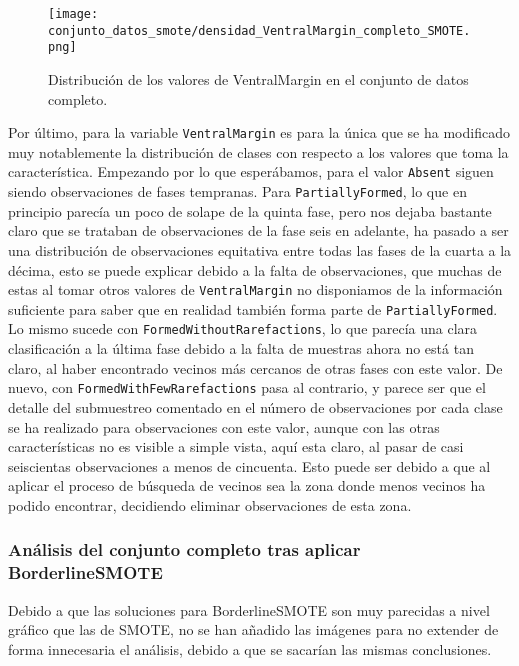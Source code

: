 \begin{figure}[H]
	\centering
	\texttt{[image: conjunto\_datos\_smote/densidad\_VentralMargin\_completo\_SMOTE.png]}
	\caption{Distribución de los valores de VentralMargin en el conjunto de datos completo.}
	\label{fig:densidad_VentralMargin_completo_smote}
\end{figure}

Por último, para la variable \texttt{VentralMargin} es para la única que se ha modificado muy notablemente la distribución de clases con respecto a los valores que toma la característica. Empezando por lo que esperábamos, para el valor \texttt{Absent} siguen siendo observaciones de fases tempranas. Para \texttt{PartiallyFormed}, lo que en principio parecía un poco de solape de la quinta fase, pero nos dejaba bastante claro que se trataban de observaciones de la fase seis en adelante, ha pasado a ser una distribución de observaciones equitativa entre todas las fases de la cuarta a la décima, esto se puede explicar debido a la falta de observaciones, que muchas de estas al tomar otros valores de \texttt{VentralMargin} no disponiamos de la información suficiente para saber que en realidad también forma parte de \texttt{PartiallyFormed}. Lo mismo sucede con \texttt{FormedWithoutRarefactions}, lo que parecía una clara clasificación a la última fase debido a la falta de muestras ahora no está tan claro, al haber encontrado vecinos más cercanos de otras fases con este valor. De nuevo, con \texttt{FormedWithFewRarefactions} pasa al contrario, y parece ser que el detalle del submuestreo comentado en el número de observaciones por cada clase se ha realizado para observaciones con este valor, aunque con las otras características no es visible a simple vista, aquí esta claro, al pasar de casi seiscientas observaciones a menos de cincuenta. Esto puede ser debido a que al aplicar el proceso de búsqueda de vecinos sea la zona donde menos vecinos ha podido encontrar, decidiendo eliminar observaciones de esta zona.

\newpage


\subsubsection{Análisis del conjunto completo tras aplicar BorderlineSMOTE}

Debido a que las soluciones para BorderlineSMOTE son muy parecidas a nivel gráfico que las de SMOTE, no se han añadido las imágenes para no extender de forma innecesaria el análisis, debido a que se sacarían las mismas conclusiones.

